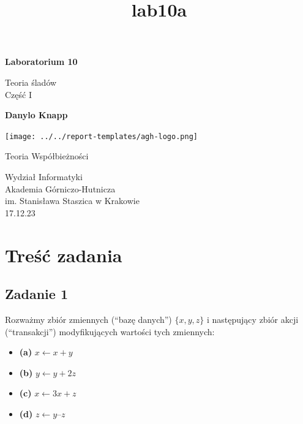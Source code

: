 \documentclass[11pt]{article}
\title{lab10a}
\providecommand{\tightlist}{%
      \setlength{\itemsep}{0pt}\setlength{\parskip}{0pt}}
\begin{document}
    
    \begin{titlepage}
        \begin{center}
            \vspace*{1cm}
    
            \textbf{Laboratorium 10}
    
            \vspace{0.5cm}
            Teoria śladów\\
            Część I
                
            \vspace{1.5cm}
    
            \textbf{Danylo Knapp}

            \vfill

            \texttt{[image: ../../report-templates/agh-logo.png]}
    
            \vfill
                
            Teoria Współbieżności
                
            \vspace{0.8cm}

            Wydział Informatyki\\
            Akademia Górniczo-Hutnicza\\
            im. Stanisława Staszica w Krakowie\\
            17.12.23
                
        \end{center}
    \end{titlepage}
    
    

    
    \hypertarget{treux15bux107-zadania}{%
\section{Treść zadania}\label{treux15bux107-zadania}}

    \hypertarget{zadanie-1}{%
\subsection{Zadanie 1}\label{zadanie-1}}

Rozważmy zbiór zmiennych (``bazę danych'') \(\{x, y, z\}\) i następujący
zbiór akcji (``transakcji'') modyfikujących wartości tych zmiennych:

\begin{itemize}
\tightlist
\item
  \textbf{(a)} \(x ← x + y\)
\item
  \textbf{(b)} \(y ← y + 2z\)
\item
  \textbf{(c)} \(x ← 3x + z\)
\item
  \textbf{(d)} \(z ← y – z\)
\end{itemize}
\end{document}
